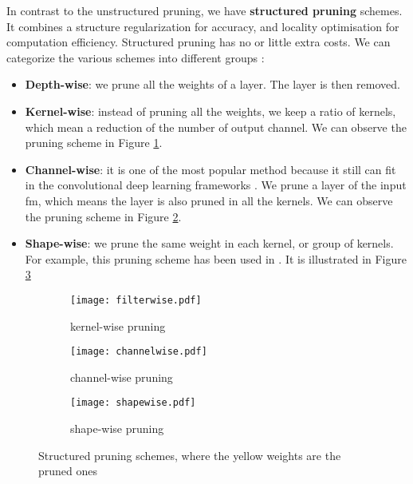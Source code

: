 In contrast to the unstructured pruning, we have \textbf{structured pruning} schemes. It combines a structure regularization for accuracy, and locality optimisation for computation efficiency. Structured pruning has no or little extra costs. We can categorize the various schemes into different groups \cite{wen_learning_2016, anwar_structured_2017, cheng_recent_2018, kang_accelerator-aware_2020}:
\begin{itemize}
    \item \textbf{Depth-wise}: we prune all the weights of a layer. The layer is then removed.
    \item \textbf{Kernel-wise}: instead of pruning all the weights, we keep a ratio of kernels, which mean a reduction of the number of output channel. We can observe the pruning scheme in Figure \ref{fig:struct_pruning:fw}.
    \item \textbf{Channel-wise}: it is one of the most popular method because it still can fit in the convolutional deep learning frameworks \cite{liu_rethinking_2019}. We prune a layer of the input \acrshort{fm}, which means the layer is also pruned in all the kernels. We can observe the pruning scheme in Figure \ref{fig:struct_pruning:chw}.
    \item \textbf{Shape-wise}: we prune the same weight in each kernel, or group of kernels. For example, this pruning scheme has been used in \textcite{zhu_efficient_2020}. It is illustrated in Figure \ref{fig:struct_pruning:sw}
\end{itemize}
%
\begin{figure}
    \centering
    \begin{subfigure}{.32\textwidth}
    \centering
    \texttt{[image: filterwise.pdf]}
    \caption{kernel-wise pruning}
    \label{fig:struct_pruning:fw}
    \end{subfigure}
    \begin{subfigure}{.32\textwidth}
    \centering
    \texttt{[image: channelwise.pdf]}
    \caption{channel-wise pruning}
    \label{fig:struct_pruning:chw}
    \end{subfigure}
    \begin{subfigure}{.32\textwidth}
    \centering
    \texttt{[image: shapewise.pdf]}
    \caption{shape-wise pruning}
    \label{fig:struct_pruning:sw}
    \end{subfigure}
    \caption{Structured pruning schemes, where the yellow weights are the pruned ones}
    \label{fig:struct_pruning}
\end{figure}
